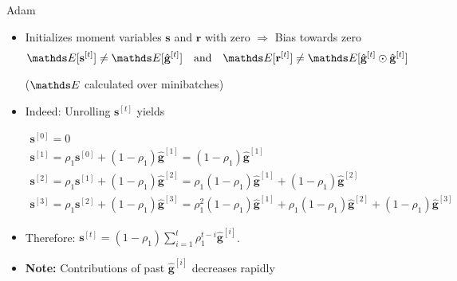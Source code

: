 \documentclass[11pt,compress,t,notes=noshow, xcolor=table]{beamer}
\begin{document}
\begin{vbframe}{Adam}
\begin{algorithm}[H]
\begin{algorithmic}[1]
			\EndWhile
		\end{algorithmic}
	\end{algorithm}
	
	
	\framebreak
	
	
	\begin{itemize}
		\item Initializes moment variables $\mathbf{s}$ and $\mathbf{r}$ with zero $\Rightarrow$ Bias towards zero
            \begin{equation*}
                \E[\mathbf{s}^{[t]}] \neq \E [\hat{\mathbf{g}}^{[t]}] \quad \text{and} \quad \E[\mathbf{r}^{[t]}] \neq \E [\hat{\mathbf{g}}^{[t]} \odot \hat{\mathbf{g}}^{[t]}]
            \end{equation*}
            
            \vspace{-0.75\baselineskip}
            
            \begin{center}
                ($\E$ calculated over minibatches)
            \end{center}
		\item Indeed: Unrolling $\mathbf{s}^{[t]}$ yields
            \begin{footnotesize}
        		\begin{gather*}
            		\mathbf{s}^{[0]} = 0 \\
            		\mathbf{s}^{[1]} = \rho_1\mathbf{s}^{[0]} + (1 - \rho_1) \hat{\mathbf{g}}^{[1]} = (1 - \rho_1) \hat{\mathbf{g}}^{[1]} \\
            		\mathbf{s}^{[2]} = \rho_1\mathbf{s}^{[1]} + (1 - \rho_1) \hat{\mathbf{g}}^{[2]} = \rho_1 (1 - \rho_1) \hat{\mathbf{g}}^{[1]} + (1 - \rho_1) \hat{\mathbf{g}}^{[2]} \\
            		\mathbf{s}^{[3]} = \rho_1\mathbf{s}^{[2]} + (1 - \rho_1) \hat{\mathbf{g}}^{[3]} = \rho_1^2 (1 - \rho_1) \hat{\mathbf{g}}^{[1]} + \rho_1 (1 - \rho_1) \hat{\mathbf{g}}^{[2]} + (1 - \rho_1) \hat{\mathbf{g}}^{[3]}
        		\end{gather*}
            \end{footnotesize}
		\item Therefore: $\mathbf{s}^{[t]}  = (1 - \rho_1) \sum_{i=1}^t \rho_1^{t - i} \hat{\mathbf{g}}^{[i]}$.
		\item \textbf{Note:} Contributions of past $\hat{\mathbf{g}}^{[i]}$ decreases rapidly
	\end{itemize}
	
	\framebreak
	

\end{vbframe}
\end{document}
